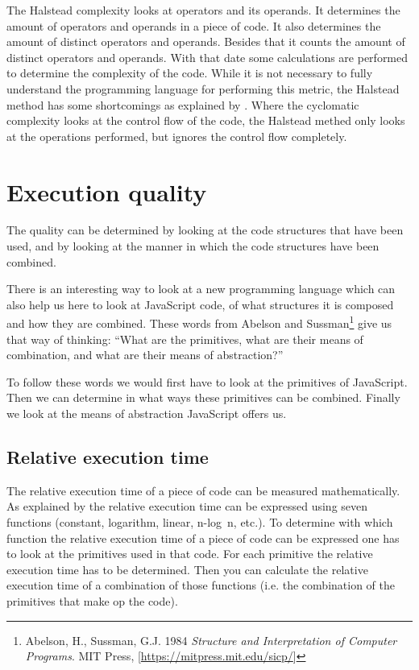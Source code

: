 \documentclass{article}
\begin{document}
The Halstead complexity looks at operators and its operands. It determines the
amount of operators and operands in a piece of code. It also determines the
amount of distinct operators and operands.  Besides that it counts the amount
of distinct operators and operands. With that date some calculations are
performed to determine the complexity of the code. While it is not necessary to
fully understand the programming language for performing this metric, the
Halstead method has some shortcomings as explained by
\citet{yu2010survey}. Where the cyclomatic complexity looks at the control flow
of the code, the Halstead methed only looks at the operations performed, but
ignores the control flow completely.

\section{Execution quality}

The quality can be determined by looking at the code structures that have been
used, and by looking at the manner in which the code structures have been
combined.

There is an interesting way to look at a new programming language which can
also help us here to look at JavaScript code, of what structures it is composed
and how they are combined. These words from Abelson and
Sussman\footnote{Abelson, H., Sussman, G.J. 1984 {\em Structure and
Interpretation of Computer Programs}. MIT Press,
[\url{https://mitpress.mit.edu/sicp/}]} give us that way of thinking: ``What
are the primitives, what are their means of combination, and what are their
means of abstraction?''

To follow these words we would first have to look at the primitives of
JavaScript. Then we can determine in what ways these primitives can be
combined. Finally we look at the means of abstraction JavaScript offers us.

\subsection{Relative execution time}

The relative execution time of a piece of code can be measured
mathematically. As explained by \citet[Chapter 4]{goodrich2008data} the
relative execution time can be expressed using seven functions (constant,
logarithm, linear, n-log~n, etc.). To determine with which function the
relative execution time of a piece of code can be expressed one has to look at
the primitives used in that code. For each primitive the relative execution
time has to be determined. Then you can calculate the relative execution time
of a combination of those functions (i.e. the combination of the primitives
that make op the code).
\end{document}

